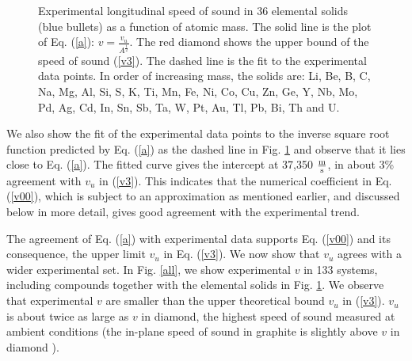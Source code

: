 \documentclass[aps,prl,groupedaddress,fleqn,twocolumn,10pt]{revtex4-1}
\begin{document}
\begin{figure}
\caption{Experimental longitudinal speed of sound \cite{handbook,handbook1,handbook2} in 36 elemental solids (blue bullets) as a function of atomic mass. The solid line is the plot of Eq. (\ref{a}): $v=\frac{v_u}{A^\frac{1}{2}}$. The red diamond shows the upper bound of the speed of sound (\ref{v3}). The dashed line is the fit to the experimental data points. In order of increasing mass, the solids are: Li, Be, B, C, Na, Mg, Al, Si, S, K, Ti, Mn, Fe, Ni, Co, Cu, Zn, Ge, Y, Nb, Mo, Pd, Ag, Cd, In, Sn, Sb, Ta, W, Pt, Au, Tl, Pb, Bi, Th and U.
}
\label{elemental}
\end{figure}

We also show the fit of the experimental data points to the inverse square root function predicted by Eq. (\ref{a}) as the dashed line in Fig. \ref{elemental} and observe that it lies close to Eq. (\ref{a}). The fitted curve gives the intercept at 37,350 $\frac{\rm m}{\rm s}$, in about 3\% agreement with $v_u$ in (\ref{v3}). This indicates that the numerical coefficient in Eq. (\ref{v00}), which is subject to an approximation as mentioned earlier, and discussed below in more detail, gives good agreement with the experimental trend.

The agreement of Eq. (\ref{a}) with experimental data supports Eq. (\ref{v00}) and its consequence, the upper limit $v_u$ in Eq. (\ref{v3}). We now show that $v_u$ agrees with a wider experimental set. In Fig. \ref{all}, we show experimental $v$ \cite{handbook,handbook1,handbook2} in 133 systems, including compounds together with the elemental solids in Fig. \ref{elemental}. We observe that experimental $v$ are smaller than the upper theoretical bound $v_u$ in (\ref{v3}). $v_u$ is about twice as large as $v$ in diamond, the highest speed of sound measured at ambient conditions (the in-plane speed of sound in graphite is slightly above $v$ in diamond \cite{behnia1}).
\end{document}
